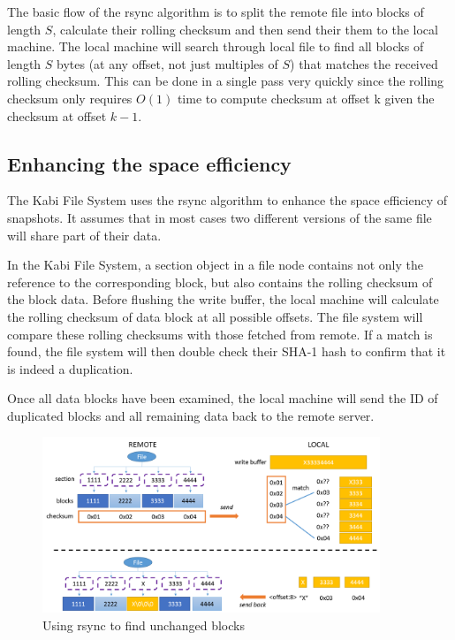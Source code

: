     The basic flow of the rsync algorithm is to split the remote file into blocks of length $S$, calculate their rolling checksum and then send their them to the local machine. The local machine will search through local file to find all blocks of length $S$ bytes (at any offset, not just multiples of $S$) that matches the received rolling checksum. This can be done in a single pass very quickly since the rolling checksum only requires $O(1)$ time to compute checksum at offset k given the checksum at offset $k-1$.

\subsection{Enhancing the space efficiency}

    The Kabi File System uses the rsync algorithm to enhance the space efficiency of snapshots. It assumes that in most cases two different versions of the same file will share part of their data.

    In the Kabi File System, a section object in a file node contains not only the reference to the corresponding block, but also contains the rolling checksum of the block data. Before flushing the write buffer, the local machine will calculate the rolling checksum of data block at all possible offsets. The file system will compare these rolling checksums with those fetched from remote. If a match is found, the file system will then double check their SHA-1 hash to confirm that it is indeed a duplication.
    
    Once all data blocks have been examined, the local machine will send the ID of duplicated blocks and all remaining data back to the remote server.


\begin{figure}[t]
\centering
\includegraphics[width=0.9\textwidth]{Chapter-4/figs/fig25.png}
\caption{Using rsync to find unchanged blocks}
\label{fig:rsync}
\end{figure}

